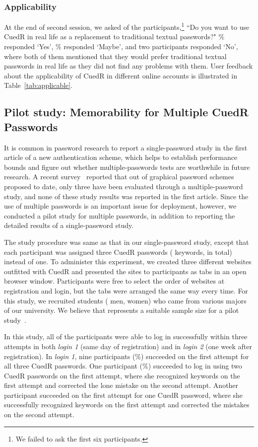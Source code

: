 \subsubsection{Applicability} At the end of second session, we asked  of the participants,\footnote{We failed to ask the first six participants.} ``Do you want to use CuedR in real life as a replacement to traditional textual passwords?" \% responded `Yes', \% responded `Maybe', and two participants responded `No', where both of them mentioned that they would prefer traditional textual passwords in real life as they did not find any problems with them. User feedback about the applicability of CuedR in different online accounts is illustrated in Table~\ref{tab:applicable}.

\subsection{Pilot study: Memorability for Multiple CuedR Passwords}
It is common in password research to report a single-password study in the first article of a new authentication scheme, which helps to establish performance bounds and figure out whether multiple-passwords tests are worthwhile in future research. A recent survey~\cite{survey} reported that out of  graphical password schemes proposed to date, only three have been evaluated through a multiple-password study, and none of these study results was reported in the first article. Since the use of multiple passwords is an important issue for deployment, however, we conducted a pilot study for multiple passwords, in addition to reporting the detailed results of a single-password study.

The study procedure was same as that in our single-password study, except that each participant was assigned three CuedR passwords ( keywords, in total) instead of one. To administer this experiment, we created three different websites outfitted with CuedR and presented the sites to participants as tabs in an open browser window. Participants were free to select the order of websites at registration and login, but the tabs were arranged the same way every time. For this study, we recruited  students ( men,  women) who came from various majors of our university. We believe that  represents a suitable sample size for a pilot study~\cite{pccp_pilot}. 

In this study, all of the participants were able to log in successfully within three attempts in both \textit{login 1} (same day of registration) and in \textit{login 2} (one week after registration). In \textit{login 1}, nine participants (\%) succeeded on the first attempt for all three CuedR passwords. One participant (\%) succeeded to log in using two CuedR passwords on the first attempt, where she recognized  keywords on the first attempt and corrected the lone mistake on the second attempt. Another participant succeeded on the first attempt for one CuedR password, where she successfully recognized  keywords on the first attempt and corrected the mistakes on the second attempt.


